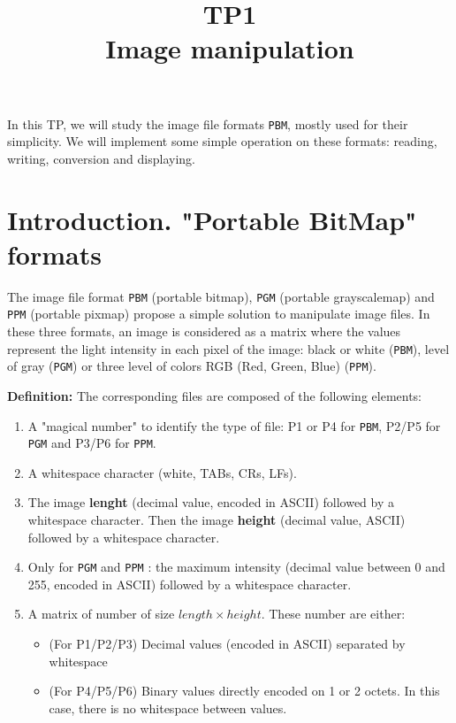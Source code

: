 \documentclass[a4paper, 11pt, english]{article}
\title{\bf{TP1 \\ Image manipulation}}
\author{}
\date{}
\begin{document}
\maketitle

\par In this TP, we will study the image file formats \texttt{PBM}, mostly used for their simplicity. We will implement some simple operation on these formats: reading, writing, conversion and displaying.

\section*{\bf Introduction. \rm "Portable BitMap" formats}

\par The image file format \texttt{PBM} (portable bitmap), \texttt{PGM} (portable grayscalemap) and \texttt{PPM} (portable pixmap) propose a simple solution to manipulate image files. In these three formats, an image is considered as a matrix where the values represent the light intensity in each pixel of the image: black or white (\texttt{PBM}), level of gray (\texttt{PGM}) or three level of colors RGB (Red, Green, Blue) (\texttt{PPM}).

\bigskip
\bigskip
\noindent \textbf{Definition:} The corresponding files are composed of the following elements:
\begin{enumerate}
	\item A "magical number" to identify the type of file: P1 or P4 for {\tt PBM}, P2/P5 for {\tt PGM} and P3/P6 for {\tt PPM}.
	\item A whitespace character (white, TABs, CRs, LFs).
	\item The image \textbf{lenght} (decimal value, encoded in ASCII) followed by a whitespace character. Then the image \textbf{height} (decimal value, ASCII) followed by a whitespace character.
	\item Only for {\tt PGM} and {\tt PPM} : the maximum intensity (decimal value between 0 and 255, encoded in ASCII) followed by a whitespace character.
	\item A matrix of number of size $length \times height$. These number are either:
	\begin{itemize}
		\item (For P1/P2/P3) Decimal values (encoded in ASCII) separated by whitespace
		\item (For P4/P5/P6) Binary values directly encoded on 1 or 2 octets. In this case, there is no whitespace between values.
	\end{itemize}
\end{enumerate}
\end{document}
